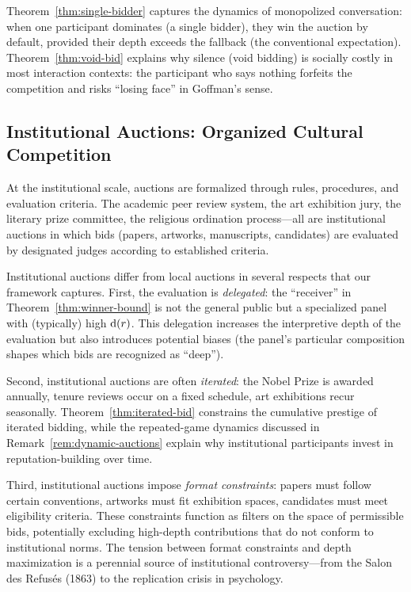 Theorem~\ref{thm:single-bidder} captures the dynamics of monopolized
conversation: when one participant dominates (a single bidder), they
win the auction by default, provided their depth exceeds the fallback
(the conventional expectation).  Theorem~\ref{thm:void-bid} explains
why silence (void bidding) is socially costly in most interaction
contexts: the participant who says nothing forfeits the competition and
risks ``losing face'' in Goffman's sense.

\subsection{Institutional Auctions: Organized Cultural Competition}

At the institutional scale, auctions are formalized through rules,
procedures, and evaluation criteria.  The academic peer review system,
the art exhibition jury, the literary prize committee, the religious
ordination process---all are institutional auctions in which bids
(papers, artworks, manuscripts, candidates) are evaluated by designated
judges according to established criteria.

Institutional auctions differ from local auctions in several respects
that our framework captures.  First, the evaluation is \emph{delegated}:
the ``receiver'' in Theorem~\ref{thm:winner-bound} is not the general
public but a specialized panel with (typically) high $\operatorname{d}(r)$.  This
delegation increases the interpretive depth of the evaluation but also
introduces potential biases (the panel's particular composition shapes
which bids are recognized as ``deep'').

Second, institutional auctions are often \emph{iterated}: the Nobel
Prize is awarded annually, tenure reviews occur on a fixed schedule,
art exhibitions recur seasonally.  Theorem~\ref{thm:iterated-bid}
constrains the cumulative prestige of iterated bidding, while the
repeated-game dynamics discussed in Remark~\ref{rem:dynamic-auctions}
explain why institutional participants invest in reputation-building
over time.

Third, institutional auctions impose \emph{format constraints}: papers
must follow certain conventions, artworks must fit exhibition spaces,
candidates must meet eligibility criteria.  These constraints function
as filters on the space of permissible bids, potentially excluding
high-depth contributions that do not conform to institutional norms.
The tension between format constraints and depth maximization is a
perennial source of institutional controversy---from the Salon des
Refusés (1863) to the replication crisis in psychology.

